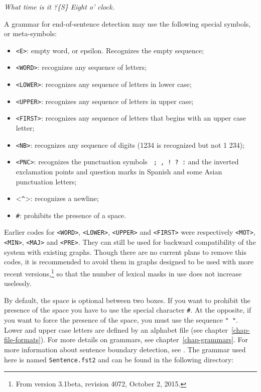 \bigskip
\textit{What time is it ?\{S\} Eight o' clock.}

\bigskip
\noindent A  grammar for end-of-sentence detection may use the following
special symbols, or meta-symbols:

\index{\verbc{<^>}}\index{\verbt{\#}}
\begin{itemize}
  \item \verb+<E>+: empty word, or epsilon. Recognizes the empty sequence;
  \item \verb+<WORD>+: recognizes any sequence of letters;
  \item \verb+<LOWER>+: recognizes any sequence of letters in lower case;
  \item \verb+<UPPER>+: recognizes any sequence of letters in upper case;
  \item \verb+<FIRST>+: recognizes any sequence of letters that begins with an upper case letter;
  \item \verb+<NB>+: recognizes any sequence of digits (1234 is recognized but not 1
  234);
  \item \verb+<PNC>+: recognizes the punctuation symbols \verb+ ; , ! ? :+ and the
  inverted exclamation points and question marks in Spanish and some Asian
  punctuation letters;
  \item <\verb+^+>: recognizes a newline;
  \item \verb+#+:
  prohibits the presence of a space.
\end{itemize}

\noindent Earlier codes for \verb+<WORD>+, \verb+<LOWER>+, \verb+<UPPER>+ and \verb+<FIRST>+
were respectively \verb+<MOT>+, \verb+<MIN>+, \verb+<MAJ>+ and \verb+<PRE>+.
They can still be used for backward compatibility of the system with existing graphs.
Though there are no current plans to remove this codes, it is recommended to avoid them in graphs designed to be used with
more recent versions,\footnote{From version 3.1beta, revision 4072, October 2, 2015.}
so that the number of lexical masks in use does not increase uselessly.

\bigskip
\noindent By default, the space is optional between two boxes. If you want to prohibit the
presence of the space you have to use the special character  \verb+#+. At the
opposite, if you want to force the presence of the space, you must use the
sequence \verb+" "+. Lower and upper case letters are defined by an alphabet
file (see chapter~\ref{chap-file-formats}). For
more details on grammars, see chapter~\ref{chap-grammars}.
For more information about sentence boundary detection, see
\cite{ameliorer-decoupage-en-phrases}. The grammar used here is named
\verb+Sentence.fst2+ and can be found in the following directory:

